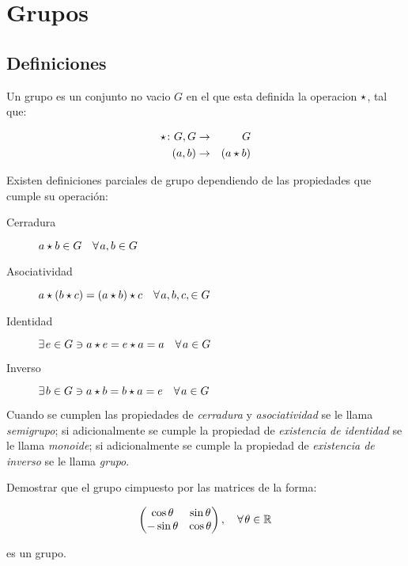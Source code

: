 
\section{Grupos}

    \subsection{Definiciones}

        \begin{definicion}
            Un grupo es un conjunto no vacio $G$ en el que esta definida la operacion $\star$, tal que:

            \begin{eqnarray}
                \star \colon G, G & \to & G \nonumber \\
                (a, b) & \to & (a \star b)
            \end{eqnarray}

            Existen definiciones parciales de grupo dependiendo de las propiedades que cumple su operación:

            \begin{description}
                \item [Cerradura] $a \star b \in G \quad \forall \mkern2mu a, b \in G$
                \item [Asociatividad] $a \star (b \star c) = (a \star b) \star c \quad \forall \mkern2mu a, b, c, \in G$
                \item [Identidad] $\exists\mkern2mu e \in G \ni a \star e = e \star a = a \quad \forall \mkern2mu a \in G$
                \item [Inverso] $\exists\mkern2mu b \in G \ni a \star b = b \star a = e \quad \forall \mkern2mu a \in G$
            \end{description}

            Cuando se cumplen las propiedades de \emph{cerradura} y \emph{asociatividad} se le llama \emph{semigrupo}; si adicionalmente se cumple la propiedad de \emph{existencia de identidad} se le llama \emph{monoide}; si adicionalmente se cumple la propiedad de \emph{existencia de inverso} se le llama \emph{grupo}.
        \end{definicion}

        \begin{ejercicio}
            Demostrar que el grupo cimpuesto por las matrices de la forma:

            \begin{equation*}
                \begin{pmatrix}
                    \cos{\theta} & \sin{\theta} \\
                    -\sin{\theta} & \cos{\theta}
                \end{pmatrix}, \quad \forall\mkern2mu \theta \in \mathbb{R}
            \end{equation*}

            es un grupo.
        \end{ejercicio}

